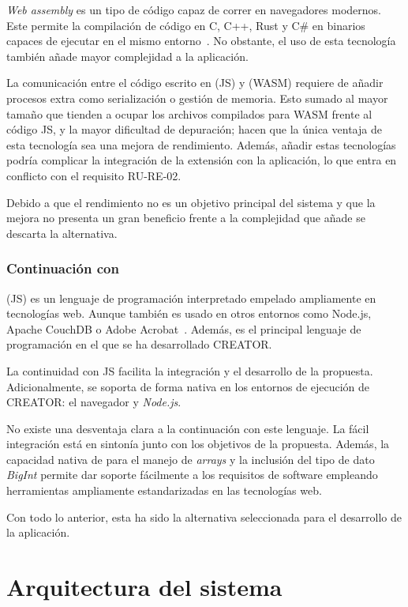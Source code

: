 \textit{Web assembly} es un tipo de código capaz de correr en navegadores modernos. Este permite la compilación de código en C, C++, Rust y C\# en binarios capaces de ejecutar en el mismo entorno~\cite{webassembly}. No obstante, el uso de esta tecnología también añade mayor complejidad a la aplicación.

La comunicación entre el código escrito en \js (JS) y \wa (WASM) requiere de añadir procesos extra como serialización o gestión de memoria. Esto sumado al mayor tamaño que tienden a ocupar los archivos compilados para WASM frente al código JS, y la mayor dificultad de depuración; hacen que la única ventaja de esta tecnología sea una mejora de rendimiento. Además, añadir estas tecnologías podría complicar la integración de la extensión con la aplicación, lo que entra en conflicto con el requisito RU-RE-02.

Debido a que el rendimiento no es un objetivo principal del sistema y que la mejora no presenta un gran beneficio frente a la complejidad que añade se descarta la alternativa.

\subsubsection{Continuación con \js}
{\js} (JS) es un lenguaje de programación interpretado empelado
ampliamente en tecnologías web. Aunque también es usado en otros entornos como
Node.js, Apache CouchDB o Adobe Acrobat~\cite{javascript}. Además, es el
principal lenguaje de programación en el que se ha desarrollado CREATOR\@.

La continuidad con JS facilita la integración y el desarrollo de la propuesta.
Adicionalmente, se soporta de forma nativa en los entornos de ejecución de
CREATOR: el navegador y \textit{Node.js}\@.

No existe una desventaja clara a la continuación con este lenguaje. La fácil integración está en sintonía junto con los objetivos de la propuesta. Además, la capacidad nativa de {\js} para el manejo de \textit{arrays} y la inclusión del tipo de dato \textit{BigInt} permite dar soporte fácilmente a los requisitos de software empleando herramientas ampliamente estandarizadas en las tecnologías web.

Con todo lo anterior, esta ha sido la alternativa seleccionada para el desarrollo de la aplicación.

\section{Arquitectura del sistema}\label{sec:arch-design}

